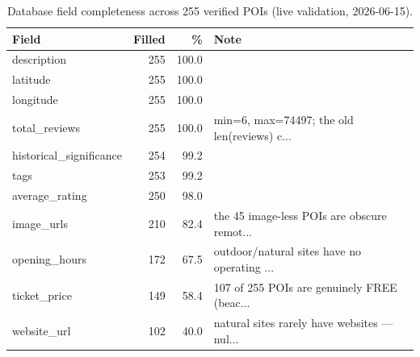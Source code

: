\begin{table}[h]\centering\small
\caption{Database field completeness across 255 verified POIs (live validation, 2026-06-15).}
\label{tab:db}\begin{tabular}{lrrl}
\toprule Field & Filled & \% & Note \\ \midrule
description & 255 & 100.0 &  \\
latitude & 255 & 100.0 &  \\
longitude & 255 & 100.0 &  \\
total_reviews & 255 & 100.0 & min=6, max=74497; the old len(reviews) c... \\
historical_significance & 254 & 99.2 &  \\
tags & 253 & 99.2 &  \\
average_rating & 250 & 98.0 &  \\
image_urls & 210 & 82.4 & the 45 image-less POIs are obscure remot... \\
opening_hours & 172 & 67.5 & outdoor/natural sites have no operating ... \\
ticket_price & 149 & 58.4 & 107 of 255 POIs are genuinely FREE (beac... \\
website_url & 102 & 40.0 & natural sites rarely have websites — nul... \\
\bottomrule\end{tabular}\end{table}
